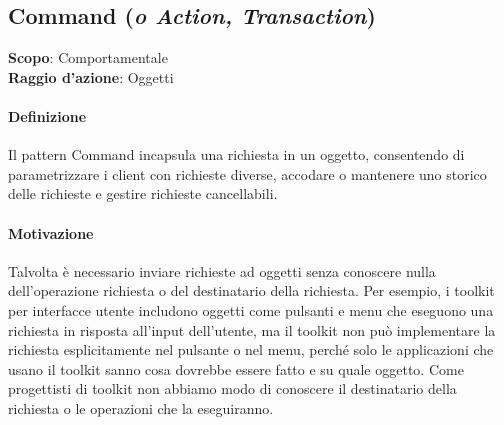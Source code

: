 \subsection{Command (\textit{o Action, Transaction})}
\label{command}

\textbf{Scopo}: Comportamentale \\
\textbf{Raggio d'azione}: Oggetti

\paragraph{Definizione} Il pattern Command incapsula una richiesta in un oggetto, consentendo di parametrizzare i client con richieste diverse, accodare o mantenere uno storico delle richieste e gestire richieste cancellabili.

\paragraph{Motivazione} Talvolta è necessario inviare richieste ad oggetti senza conoscere nulla dell'operazione richiesta o del destinatario della richiesta. Per esempio, i toolkit per interfacce utente includono oggetti come pulsanti e menu che eseguono una richiesta in risposta all'input dell'utente, ma il toolkit non può implementare la richiesta esplicitamente nel pulsante o nel menu, perché solo le applicazioni che usano il toolkit sanno cosa dovrebbe essere fatto e su quale oggetto. Come progettisti di toolkit non abbiamo modo di conoscere il destinatario della richiesta o le operazioni che la eseguiranno.

